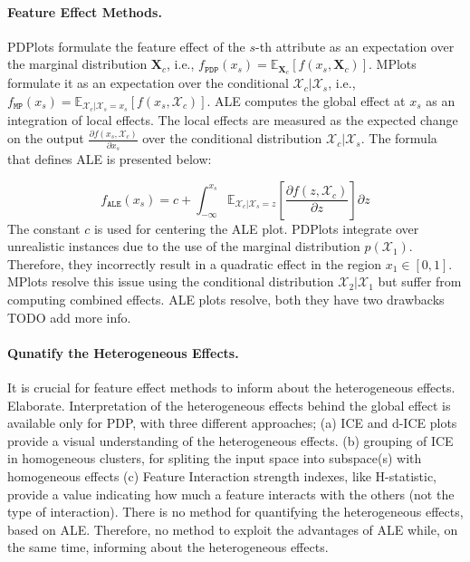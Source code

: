\documentclass[twoside]{article}
\newcommand{\Xcb}{\mathcal{X}_c}
\begin{document}
\paragraph{Feature Effect Methods.} PDPlots formulate the feature
effect of the \(s\)-th attribute as an expectation over the marginal
distribution \(\mathbf{X}_c\), i.e.,
\(f_{\mathtt{PDP}}(x_s) =
\mathbb{E}_{\mathbf{X}_c}[f(x_s,\mathbf{X}_c)]\). MPlots formulate
it as an expectation over the conditional
\(\mathcal{X}_c|\mathcal{X}_s\), i.e.,
\(f_{\mathtt{MP}}(x_s) = \mathbb{E}_{\mathcal{X}_c|\mathcal{X}_s = x_s}[f(x_s,
\mathcal{X}_c)]\). ALE computes the global effect at \(x_s\) as an
integration of local effects. The local effects are measured as the
expected change on the output
\( \frac{\partial f(x_s, \mathcal{X}_c)}{\partial x_s} \) over the
conditional distribution \( \Xcb|\mathcal{X}_s\). The formula that
defines ALE is presented below:

\begin{equation}
  \label{eq:ALE}
  f_{\mathtt{ALE}}(x_s) = c + \int_{-\infty}^{x_s} \mathbb{E}_{\Xcb|\mathcal{X}_s=z}\left[\frac{\partial f(z, \mathcal{X}_c)}{\partial z}\right] \partial z
\end{equation}
%
The constant \(c\) is used for centering the ALE plot. PDPlots
integrate over unrealistic instances due to the use of the marginal
distribution \( p(\mathcal{X}_1) \). Therefore, they incorrectly
result in a quadratic effect in the region \(x_1 \in [0, 1]\). MPlots
resolve this issue using the conditional distribution
\( \mathcal{X}_2|\mathcal{X}_1 \) but suffer from computing combined
effects. ALE plots resolve, both they have two drawbacks TODO add more
info.

\paragraph{Qunatify the Heterogeneous Effects.}
It is crucial for feature effect methods to inform about the
heterogeneous effects. Elaborate. Interpretation of the heterogeneous
effects behind the global effect is available only for PDP, with three
different approaches; (a) ICE and d-ICE plots provide a visual
understanding of the heterogeneous effects. (b) grouping of ICE in
homogeneous clusters, for spliting the input space into subspace(s)
with homogeneous effects (c) Feature Interaction strength indexes,
like H-statistic, provide a value indicating how much a feature
interacts with the others (not the type of interaction). There is no
method for quantifying the heterogeneous effects, based on
ALE. Therefore, no method to exploit the advantages of ALE while, on
the same time, informing about the heterogeneous effects. 
\end{document}
